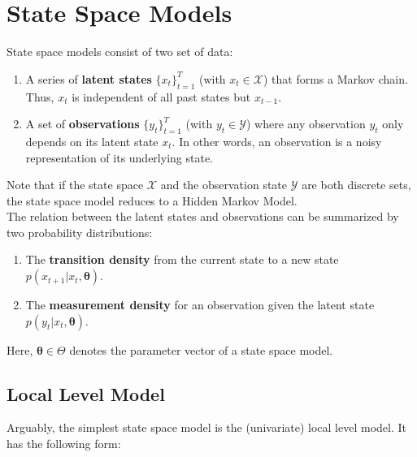 \documentclass[11pt, oneside]{scrreprt}   	%
\begin{document}
\chapter{State Space Models}
\label{chp:models}
State space models consist of two set of data:
\begin{enumerate}
	\item A series of \textbf{latent states} $\{x_t\}_{t=1}^T$ (with $x_t \in \mathcal{X}$) that forms a Markov chain. Thus, $x_t$ is independent of all past states but $x_{t-1}$.
	\item A set of \textbf{observations} $\{y_t\}_{t=1}^T$ (with $y_t \in \mathcal{Y}$) where any observation $y_t$ only depends on its latent state $x_t$. In other words, an observation is a noisy representation of its underlying state.
\end{enumerate}
Note that if the state space $\mathcal{X}$ and the observation state $\mathcal{Y}$ are both discrete sets, the state space model reduces to a Hidden Markov Model.\\

The relation between the latent states and observations can be summarized by two probability distributions:
\begin{enumerate}
	\item The \textbf{transition density} from the current state to a new state $p(x_{t+1} | x_t, \boldsymbol{\theta})$.
	\item The \textbf{measurement density} for an observation given the latent state $p(y_t | x_t, \boldsymbol{\theta})$.
\end{enumerate}
Here, $\boldsymbol{\theta} \in \Theta$ denotes the parameter vector of a state space model. 


\section{Local Level Model}
Arguably, the simplest state space model is the (univariate) local level model. It has the following form:
\end{document}
